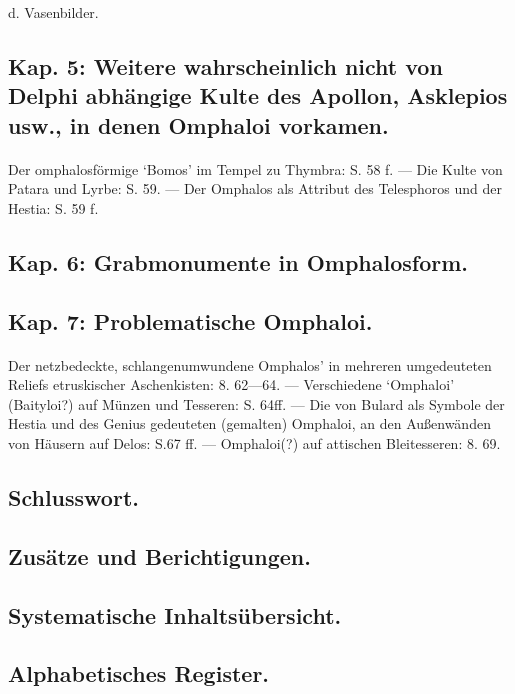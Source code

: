 \documentclass[a4paper, 11pt, oneside]{article}
\begin{document}
d. Vasenbilder.

\subsection*{Kap. 5: Weitere wahrscheinlich nicht von Delphi abhängige Kulte des Apollon, Asklepios usw., in denen Omphaloi vorkamen.}
\paragraph{}
Der omphalosförmige `Bomos' im Tempel zu Thymbra: S. 58 f. --- Die Kulte von Patara und Lyrbe: S. 59. --- Der Omphalos als Attribut des Telesphoros und der Hestia: S. 59 f.

\subsection*{Kap. 6: Grabmonumente in Omphalosform.}

\subsection*{Kap. 7: Problematische Omphaloi.}
\paragraph{}
Der netzbedeckte, schlangenumwundene Omphalos' in mehreren umgedeuteten Reliefs etruskischer Aschenkisten: 8. 62---64. --- Verschiedene `Omphaloi' (Baityloi?) auf Münzen und Tesseren: S. 64ff. --- Die von Bulard als Symbole der Hestia und des Genius gedeuteten (gemalten) Omphaloi, an den Außenwänden von Häusern auf Delos: S.67 ff. --- Omphaloi(?) auf attischen Bleitesseren: 8. 69.

\subsection*{Schlusswort.}

\subsection*{Zusätze und Berichtigungen.}

\subsection*{Systematische Inhaltsübersicht.}

\subsection*{Alphabetisches Register.}
\end{document}
